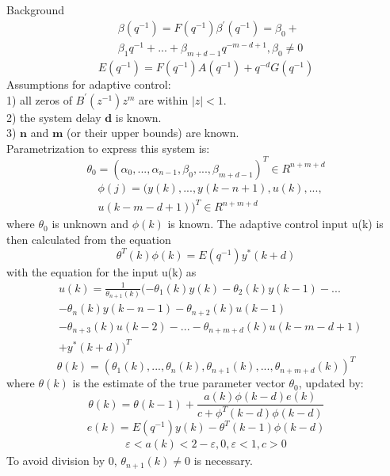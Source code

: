\begin{section}{Background}
	\begin{align}
	& \beta(q^{-1})=F(q^{-1})\beta^{'}(q^{-1})=\beta_0+ \nonumber \\
	& \beta_1q^{-1}+ ... +\beta_{m+d-1}q^{-m-d+1}, \beta_0\neq0
	\end{align}
	\begin{equation}
	E(q^{-1})=F(q^{-1})A(q^{-1})+q^{-d}G(q^{-1})
	\end{equation}
	Assumptions for adaptive control: \\
	1) all zeros of $B^{'}(z^{-1})z^m$ are within $|z|<1$. \\
	2) the system delay $\bm{d}$ is known. \\
	3) $\bm{n}$ and $\bm{m}$ (or their upper bounds) are known. \\
Parametrization to express this system is:
	\begin{equation}
	\theta_0=(\alpha_0, ... ,\alpha_{n-1},\beta_0, ... ,\beta_{m+d-1})^T \in R^{n+m+d}
	\end{equation}
	\begin{align}
	& \phi(j)=(y(k), ... ,y(k-n+1),u(k), ... , \nonumber \\
	& u(k-m-d+1))^T \in R^{n+m+d}
	\end{align}
where $\theta_0$ is unknown and $\phi(k)$ is known.
	The adaptive control input u(k) is then calculated from the equation
	\begin{equation}
	\theta^T(k)\phi(k)=E(q^{-1})y^{*}(k+d)
	\end{equation}
with the equation for the input u(k) as
	\begin{align}
	& u(k)=\frac{1}{\theta_{n+1}(k)}(-\theta_1(k)y(k)-\theta_2(k)y(k-1)- ...  \nonumber \\
	& -\theta_n(k)y(k-n-1)-\theta_{n+2}(k)u(k-1) \nonumber \\
	& -\theta_{n+3}(k)u(k-2)- ... - \theta_{n+m+d}(k)u(k-m-d+1) \nonumber \\
	& +y^{*}(k+d))^T
	\end{align}
	\begin{equation}
	\theta(k)=(\theta_1(k), ... ,\theta_n(k),\theta_{n+1}(k), ... ,\theta_{n+m+d}(k))^T
	\end{equation}
where $\theta(k)$ is the estimate of the true parameter vector $\theta_0$, updated by:
	\begin{equation}
	\theta(k)=\theta(k-1)+\frac{a(k)\phi(k-d)e(k)}{c+\phi^T(k-d)\phi(k-d)}
	\end{equation}
	\begin{equation}
	e(k)=E(q^{-1})y(k)-\theta^T(k-1)\phi(k-d)
	\end{equation}
	\begin{align*}
	\varepsilon<a(k)<2-\varepsilon, 0,\varepsilon<1, c>0
	\end{align*}
To avoid division by 0, $\theta_{n+1}(k)\neq0$ is necessary.


\end{section}
